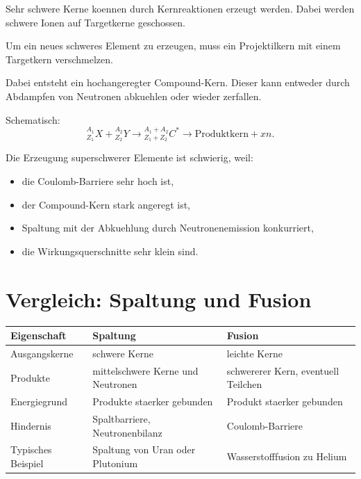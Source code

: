 Sehr schwere Kerne koennen durch Kernreaktionen erzeugt werden.
Dabei werden schwere Ionen auf Targetkerne geschossen.

\begin{conceptbox}
Um ein neues schweres Element zu erzeugen, muss ein Projektilkern mit einem Targetkern
verschmelzen.

Dabei entsteht ein hochangeregter Compound-Kern.
Dieser kann entweder durch Abdampfen von Neutronen abkuehlen oder wieder zerfallen.
\end{conceptbox}

\begin{formulabox}
Schematisch:
\[
    {}^{A_1}_{Z_1}X
    +
    {}^{A_2}_{Z_2}Y
    \rightarrow
    {}^{A_1+A_2}_{Z_1+Z_2}C^{*}
    \rightarrow
    \text{Produktkern}
    +
    x n.
\]
\end{formulabox}

\begin{conceptbox}
Die Erzeugung superschwerer Elemente ist schwierig, weil:
\begin{itemize}
    \item die Coulomb-Barriere sehr hoch ist,
    \item der Compound-Kern stark angeregt ist,
    \item Spaltung mit der Abkuehlung durch Neutronenemission konkurriert,
    \item die Wirkungsquerschnitte sehr klein sind.
\end{itemize}
\end{conceptbox}

\section{Vergleich: Spaltung und Fusion}

\begin{center}
\begin{tabular}{|p{4.2cm}|p{5.1cm}|p{5.1cm}|}
\hline
Eigenschaft & Spaltung & Fusion \\
\hline
Ausgangskerne & schwere Kerne & leichte Kerne \\
\hline
Produkte & mittelschwere Kerne und Neutronen & schwererer Kern, eventuell Teilchen \\
\hline
Energiegrund & Produkte staerker gebunden & Produkt staerker gebunden \\
\hline
Hindernis & Spaltbarriere, Neutronenbilanz & Coulomb-Barriere \\
\hline
Typisches Beispiel & Spaltung von Uran oder Plutonium & Wasserstofffusion zu Helium \\
\hline
\end{tabular}
\end{center}

